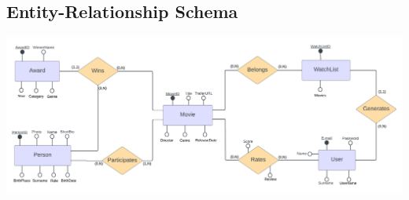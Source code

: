 \subsection{Entity-Relationship Schema}

\begin{center}
    \includegraphics[width=17cm]{pictures/WebEdge-ER-vers07.png}
\end{center}



